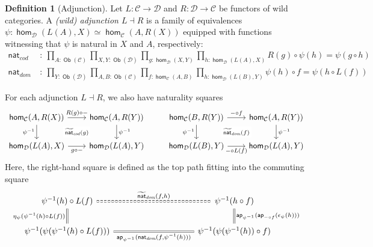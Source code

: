 \documentclass[10pt,a4paper]{article}
\theoremstyle{definition}
\newtheorem{defi}[thm]{Definition}
\theoremstyle{remark}
\newcommand{\C}{\mathcal C}
\newcommand{\D}{\mathcal D}
\newcommand{\dom}{\textit{dom}}
\newcommand{\cod}{\textit{cod}}
\newcommand{\nat}{\mathsf{nat}}
\newcommand{\0}{\mathbf{0}}
\newcommand{\1}{\mathbf{1}}
\newcommand{\2}{\mathbf{2}}
\DeclareMathOperator{\ap}{\mathsf{ap}}
\DeclareMathOperator{\homm}{\mathsf{hom}}
\DeclareMathOperator{\obb}{\mathsf{Ob}}
\begin{document}
\begin{defi}[Adjunction]\label{adjdef}
Let $L : \C \to \D$ and $R: \D \to \C$ be functors of wild categories.  A \emph{(wild) adjunction $L \dashv R$} is a family of equivalences
$\psi  : \homm_{\D}(L(A), X) \simeq \homm_{\C}(A,R(X))$ equipped with functions witnessing that $\psi$ is natural in $X$ and $A$, respectively:
\begin{align*}
\nat_{\cod} & \ : \ \prod_{A :\obb(\C)}\prod_{ X, Y : \obb(\D)}\prod_{g : \homm_{\D}(X,Y)}\prod_{h : \homm_{\D}(L(A), X)}R(g) \circ \psi(h) = \psi(g \circ h)
\\ \nat_{\dom} & \ : \ \prod_{Y : \obb(\D)}\prod_{ A, B : \obb(\C)}\prod_{f : \homm_{\C}(A,B)}\prod_{h : \homm_{\D}(L(B), Y)}\psi(h) \circ f = \psi(h \circ L(f))
\end{align*} 
\end{defi}
For each adjunction $L \dashv R$, we also have naturality squares
\[\begin{tikzcd}[column sep = 22]
	{\homm_{\C}(A, R(X))} & {\homm_{\C}(A, R(Y))} & {\homm_{\C}(B, R(Y))} & {\homm_{\C}(A, R(Y))} \\
	{\homm_{\D}(L(A), X)} & {\homm_{\D}(L(A), Y)} & {\homm_{\D}(L(B), Y)} & {\homm_{\D}(L(A),Y)}
	\arrow[""{name=0, anchor=center, inner sep=0}, "{{R(g) \circ {-}}}", from=1-1, to=1-2]
	\arrow["{{\psi^{-1}}}"', from=1-1, to=2-1]
	\arrow["{{\psi^{-1}}}", from=1-2, to=2-2]
	\arrow[""{name=1, anchor=center, inner sep=0}, "{{{-} \circ f}}", from=1-3, to=1-4]
	\arrow["{{\psi^{-1}}}"', from=1-3, to=2-3]
	\arrow["{{\psi^{-1}}}", from=1-4, to=2-4]
	\arrow[""{name=2, anchor=center, inner sep=0}, "{{g \circ {-}}}"', from=2-1, to=2-2]
	\arrow[""{name=3, anchor=center, inner sep=0}, "{{{-} \circ L(f)}}"', from=2-3, to=2-4]
	\arrow["{{\widetilde{\nat}_{\cod}(g)}}"{description}, draw=none, from=0, to=2]
	\arrow["{{\widetilde{\nat}_{\dom}(f)}}"{description}, draw=none, from=1, to=3]
\end{tikzcd}\]
Here, the right-hand square is defined as the top path fitting into the commuting square
\[
\begin{tikzcd}[column sep = huge]
	{\psi^{-1}(h) \circ L(f)} && {\psi^{-1}(h \circ f)} \\
	{\psi^{-1}(\psi(\psi^{-1}(h) \circ L(f)))} && {\psi^{-1}(\psi (\psi^{-1}(h)) \circ f)}
	\arrow["{{\widetilde{\nat}_{\dom}(f,h)}}", Rightarrow, no head, dashed, from=1-1, to=1-3]
	\arrow["{{\eta_{\psi}(\psi^{-1}(h) \circ L(f))}}"', equals, from=1-1, to=2-1]
	\arrow["{{\ap_{\psi^{-1}}(\nat_{\dom}(f, \psi^{-1}(h)))}}"', equals, from=2-1, to=2-3]
	\arrow["{{\ap_{\psi^{-1}}(\ap_{{-} \circ f}(\epsilon_{\psi}(h)))}}"', equals, from=2-3, to=1-3]
\end{tikzcd}
\]
\end{document}
